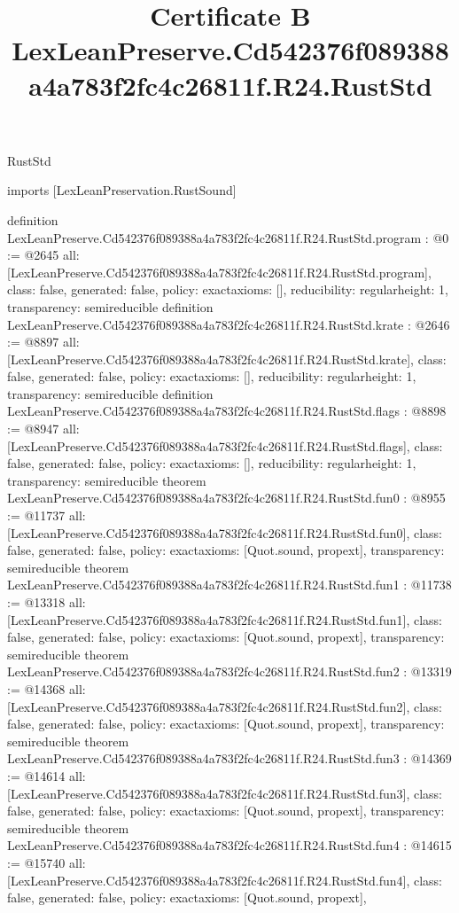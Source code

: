 \begin{lexlean}{RustStd}
\title{Certificate B LexLeanPreserve.Cd542376f089388a4a783f2fc4c26811f.R24.RustStd}
\begin{coremodule}
imports [LexLeanPreservation.RustSound]

definition LexLeanPreserve.Cd542376f089388a4a783f2fc4c26811f.R24.RustStd.program : @0 := @2645 {
  all: [LexLeanPreserve.Cd542376f089388a4a783f2fc4c26811f.R24.RustStd.program],
  class: false,
  generated: false,
  policy: exact{axioms: []},
  reducibility: regular{height: 1},
  transparency: semireducible
}
definition LexLeanPreserve.Cd542376f089388a4a783f2fc4c26811f.R24.RustStd.krate : @2646 := @8897 {
  all: [LexLeanPreserve.Cd542376f089388a4a783f2fc4c26811f.R24.RustStd.krate],
  class: false,
  generated: false,
  policy: exact{axioms: []},
  reducibility: regular{height: 1},
  transparency: semireducible
}
definition LexLeanPreserve.Cd542376f089388a4a783f2fc4c26811f.R24.RustStd.flags : @8898 := @8947 {
  all: [LexLeanPreserve.Cd542376f089388a4a783f2fc4c26811f.R24.RustStd.flags],
  class: false,
  generated: false,
  policy: exact{axioms: []},
  reducibility: regular{height: 1},
  transparency: semireducible
}
theorem LexLeanPreserve.Cd542376f089388a4a783f2fc4c26811f.R24.RustStd.fun0 : @8955 := @11737 {
  all: [LexLeanPreserve.Cd542376f089388a4a783f2fc4c26811f.R24.RustStd.fun0],
  class: false,
  generated: false,
  policy: exact{axioms: [Quot.sound, propext]},
  transparency: semireducible
}
theorem LexLeanPreserve.Cd542376f089388a4a783f2fc4c26811f.R24.RustStd.fun1 : @11738 := @13318 {
  all: [LexLeanPreserve.Cd542376f089388a4a783f2fc4c26811f.R24.RustStd.fun1],
  class: false,
  generated: false,
  policy: exact{axioms: [Quot.sound, propext]},
  transparency: semireducible
}
theorem LexLeanPreserve.Cd542376f089388a4a783f2fc4c26811f.R24.RustStd.fun2 : @13319 := @14368 {
  all: [LexLeanPreserve.Cd542376f089388a4a783f2fc4c26811f.R24.RustStd.fun2],
  class: false,
  generated: false,
  policy: exact{axioms: [Quot.sound, propext]},
  transparency: semireducible
}
theorem LexLeanPreserve.Cd542376f089388a4a783f2fc4c26811f.R24.RustStd.fun3 : @14369 := @14614 {
  all: [LexLeanPreserve.Cd542376f089388a4a783f2fc4c26811f.R24.RustStd.fun3],
  class: false,
  generated: false,
  policy: exact{axioms: [Quot.sound, propext]},
  transparency: semireducible
}
theorem LexLeanPreserve.Cd542376f089388a4a783f2fc4c26811f.R24.RustStd.fun4 : @14615 := @15740 {
  all: [LexLeanPreserve.Cd542376f089388a4a783f2fc4c26811f.R24.RustStd.fun4],
  class: false,
  generated: false,
  policy: exact{axioms: [Quot.sound, propext]},
}
\end{coremodule}
\end{lexlean}
